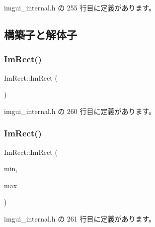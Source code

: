  imgui\+\_\+internal.\+h の 255 行目に定義があります。



\subsection{構築子と解体子}
\mbox{\label{struct_im_rect_a57399f36758ed3eb1eb762143401ff54}} 
\subsubsection{\texorpdfstring{Im\+Rect()}{ImRect()}\hspace{0.1cm}{\footnotesize\ttfamily [1/4]}}
{\footnotesize\ttfamily Im\+Rect\+::\+Im\+Rect (\begin{DoxyParamCaption}{ }\end{DoxyParamCaption})\hspace{0.3cm}{\ttfamily [inline]}}



 imgui\+\_\+internal.\+h の 260 行目に定義があります。

\mbox{\label{struct_im_rect_a2f0ff273434bfd9d22bb699fd7a63a1f}} 
\subsubsection{\texorpdfstring{Im\+Rect()}{ImRect()}\hspace{0.1cm}{\footnotesize\ttfamily [2/4]}}
{\footnotesize\ttfamily Im\+Rect\+::\+Im\+Rect (\begin{DoxyParamCaption}\item[{const \mbox{\hyperlink{struct_im_vec2}{Im\+Vec2}} \&}]{min,  }\item[{const \mbox{\hyperlink{struct_im_vec2}{Im\+Vec2}} \&}]{max }\end{DoxyParamCaption})\hspace{0.3cm}{\ttfamily [inline]}}



 imgui\+\_\+internal.\+h の 261 行目に定義があります。

\mbox{\label{struct_im_rect_adfe8d43381f9af8a3e3ea32a3821ab84}} 
